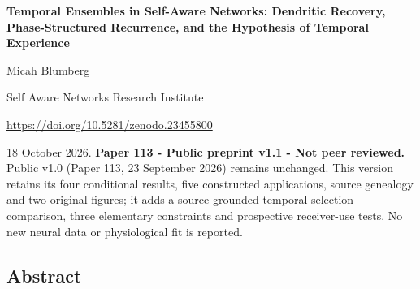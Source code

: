 \documentclass[
  american,
  11pt,
  letterpaper,
]{article}
\author{}
\date{}
\begin{document}
\begin{center}
{\LARGE\bfseries Temporal Ensembles in Self-Aware Networks: Dendritic Recovery, Phase-Structured Recurrence, and the Hypothesis of Temporal Experience\par}
\vspace{0.6em}
Micah Blumberg\par
Self Aware Networks Research Institute\par
\url{https://doi.org/10.5281/zenodo.23455800}
\end{center}

18 October 2026. \textbf{Paper 113 - Public preprint v1.1 - Not peer reviewed.} Public v1.0 (Paper 113, 23 September 2026) remains unchanged. This version retains its four conditional results, five constructed applications, source genealogy and two original figures; it adds a source-grounded temporal-selection comparison, three elementary constraints and prospective receiver-use tests. No new neural data or physiological fit is reported.

\subsection{Abstract}\label{abstract}
\end{document}
